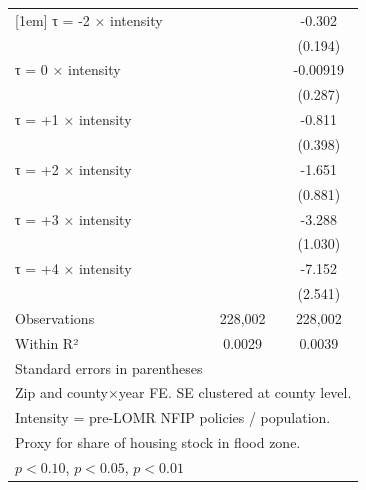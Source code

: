 \begin{table}[htbp]
\begin{tabular}{l*{2}{c}}
[1em]
τ = -2 × intensity  &                     &      -0.302         \\
                    &                     &     (0.194)         \\
[1em]
τ = 0 × intensity   &                     &    -0.00919         \\
                    &                     &     (0.287)         \\
[1em]
τ = +1 × intensity  &                     &      -0.811\sym{**} \\
                    &                     &     (0.398)         \\
[1em]
τ = +2 × intensity  &                     &      -1.651\sym{*}  \\
                    &                     &     (0.881)         \\
[1em]
τ = +3 × intensity  &                     &      -3.288\sym{***}\\
                    &                     &     (1.030)         \\
[1em]
τ = +4 × intensity  &                     &      -7.152\sym{***}\\
                    &                     &     (2.541)         \\
\hline
Observations        &     228,002         &     228,002         \\
Within R²           &      0.0029         &      0.0039         \\
\hline\hline
\multicolumn{3}{l}{\footnotesize Standard errors in parentheses}\\
\multicolumn{3}{l}{\footnotesize Zip and county×year FE. SE clustered at county level.}\\
\multicolumn{3}{l}{\footnotesize Intensity = pre-LOMR NFIP policies / population.}\\
\multicolumn{3}{l}{\footnotesize Proxy for share of housing stock in flood zone.}\\
\multicolumn{3}{l}{\footnotesize \sym{*} \(p<0.10\), \sym{**} \(p<0.05\), \sym{***} \(p<0.01\)}\\
\end{tabular}
\end{table}
